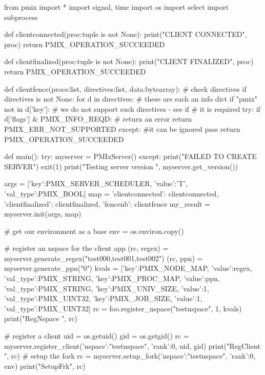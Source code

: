 \pyspecificstart
\begin{codepar}
from pmix import *
import signal, time
import os
import select
import subprocess

def clientconnected(proc:tuple is not None):
    print("CLIENT CONNECTED", proc)
    return PMIX_OPERATION_SUCCEEDED

def clientfinalized(proc:tuple is not None):
    print("CLIENT FINALIZED", proc)
    return PMIX_OPERATION_SUCCEEDED

def clientfence(procs:list, directives:list, data:bytearray):
    # check directives
    if directives is not None:
        for d in directives:
            # these are each an info dict
            if "pmix" not in d['key']:
                # we do not support such directives - see if
                # it is required
                try:
                    if d['flags'] & PMIX_INFO_REQD:
                        # return an error
                        return PMIX_ERR_NOT_SUPPORTED
                except:
                    #it can be ignored
                    pass
    return PMIX_OPERATION_SUCCEEDED

def main():
    try:
        myserver = PMIxServer()
    except:
        print("FAILED TO CREATE SERVER")
        exit(1)
    print("Testing server version ", myserver.get_version())

    args = [{'key':PMIX_SERVER_SCHEDULER,
             'value':'T', 'val_type':PMIX_BOOL}]
    map = {'clientconnected': clientconnected,
           'clientfinalized': clientfinalized,
           'fencenb': clientfence}
    my_result = myserver.init(args, map)

    # get our environment as a base
    env = os.environ.copy()

    # register an nspace for the client app
    (rc, regex) = myserver.generate_regex("test000,test001,test002")
    (rc, ppn) = myserver.generate_ppn("0")
    kvals = [{'key':PMIX_NODE_MAP,
              'value':regex, 'val_type':PMIX_STRING},
             {'key':PMIX_PROC_MAP,
              'value':ppn, 'val_type':PMIX_STRING},
             {'key':PMIX_UNIV_SIZE,
              'value':1, 'val_type':PMIX_UINT32},
             {'key':PMIX_JOB_SIZE,
              'value':1, 'val_type':PMIX_UINT32}]
    rc = foo.register_nspace("testnspace", 1, kvals)
    print("RegNspace ", rc)

    # register a client
    uid = os.getuid()
    gid = os.getgid()
    rc = myserver.register_client({'nspace':"testnspace", 'rank':0},
                                  uid, gid)
    print("RegClient ", rc)
    # setup the fork
    rc = myserver.setup_fork({'nspace':"testnspace", 'rank':0}, env)
    print("SetupFrk", rc)


\end{codepar}
